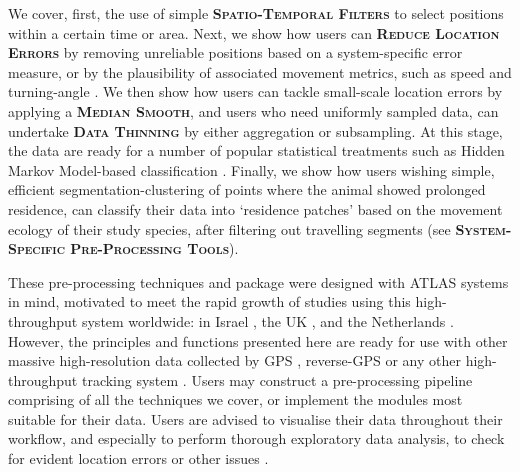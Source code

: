 \begin{refsection}
    We cover, first, the use of simple \textsc{\textbf{Spatio-Temporal Filters}} to select positions within a certain time or area.
    Next, we show how users can \textsc{\textbf{Reduce Location Errors}} by removing unreliable positions based on a system-specific error measure, or by the plausibility of associated movement metrics, such as speed and turning-angle \citep{seidel2018, calenge2009}.
    We then show how users can tackle small-scale location errors by applying a \textsc{\textbf{Median Smooth}}, and users who need uniformly sampled data, can undertake \textsc{\textbf{Data Thinning}} by either aggregation or subsampling.
    At this stage, the data are ready for a number of popular statistical treatments such as Hidden Markov Model-based classification \citep{michelot2016,langrock2012}.
    Finally, we show how users wishing simple, efficient segmentation-clustering of points where the animal showed prolonged residence, can classify their data into `residence patches' \citep{barraquand2008, bijleveld2016} based on the movement ecology of their study species, after filtering out travelling segments (see \textsc{\textbf{System-Specific Pre-Processing Tools}}).

    These pre-processing techniques and package were designed with ATLAS systems in mind, motivated to meet the rapid growth of studies using this high-throughput system worldwide: in Israel \citep{toledo2014, toledo2016, toledo2020, corl2020, vilk2021}, the UK \citep{beardsworth2021a, beardsworth2021b}, and the Netherlands \citep[][Bijleveld et al. \textit{in prep.}]{beardsworth2021}. 
    However, the principles and functions presented here are ready for use with other massive high-resolution data collected by GPS \citep[e.g.][]{papageorgiou2019}, reverse-GPS \citep[e.g.][]{aspillaga2021} or any other high-throughput tracking system .
    Users may construct a pre-processing pipeline comprising of all the techniques we cover, or implement the modules most suitable for their data.
    Users are advised to visualise their data throughout their workflow, and especially to perform thorough exploratory data analysis, to check for evident location errors or other issues \citep{slingsby2016}.

        

\end{refsection}
